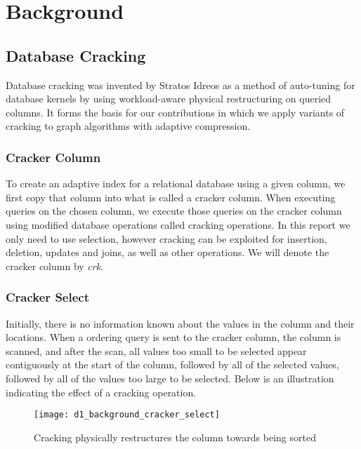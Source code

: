 \chapter{Background}

\label{ch:background}

\section{Database Cracking}

Database cracking was invented by Stratos Idreos as a method of auto-tuning for database kernels by using workload-aware physical restructuring on queried columns. It forms the basis for our contributions in which we apply variants of cracking to graph algorithms with adaptive compression.

\subsection{Cracker Column}

To create an adaptive index for a relational database using a given column, we first copy that column into what is called a cracker column. When executing queries on the chosen column, we execute those queries on the cracker column using modified database operations called cracking operations. In this report we only need to use selection, however cracking can be exploited for insertion, deletion, updates and joins, as well as other operations. We will denote the cracker column by \textit{crk}.

\subsection{Cracker Select}

Initially, there is no information known about the values in the column and their locations. When a ordering query is sent to the cracker column, the column is scanned, and after the scan, all values too small to be selected appear contiguously at the start of the column, followed by all of the selected values, followed by all of the values too large to be selected. Below is an illustration indicating the effect of a cracking operation.

\begin{figure}[h]
  \centering
  \texttt{[image: d1\_background\_cracker\_select]}
  \caption{Cracking physically restructures the column towards being sorted}
  \label{fig:cracker_select_restructuring}
\end{figure}

